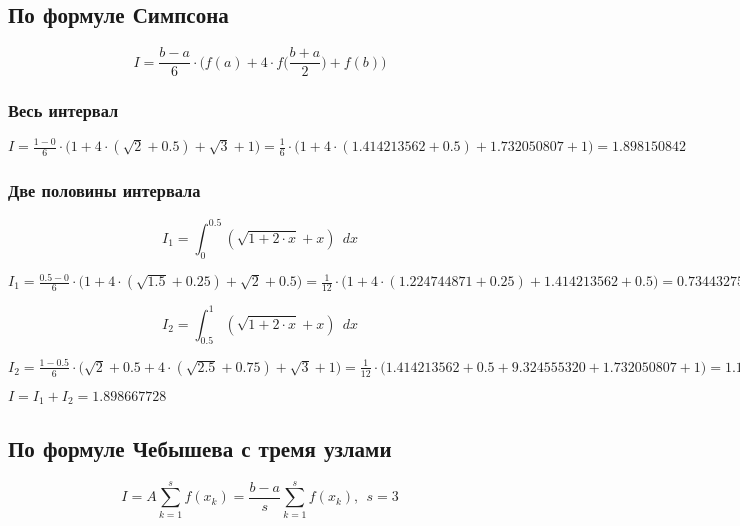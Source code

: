 \subsection{По формуле Симпсона}

\begin{displaymath}
I = \frac{b - a}{6} \cdot \Big ( f(a) + 4 \cdot f \Big (\frac{b+a}{2} \Big ) + f(b) \Big )
\end{displaymath}

\subsubsection{Весь интервал}

$I = \frac{1 - 0}{6} \cdot \Big ( 1 + 4 \cdot (\sqrt{2} + 0.5) + \sqrt{3} + 1 \Big ) = \frac{1}{6} \cdot \Big ( 1 + 4 \cdot (1.414213562 + 0.5) + 1.732050807 + 1 \Big ) = 1.898150842$

\subsubsection{Две половины интервала}

\begin{displaymath}
I_1 = \int_{0}^{0.5} (\sqrt{1 + 2 \cdot x} + x)\ \ dx
\end{displaymath}

$I_1 = \frac{0.5 - 0}{6} \cdot \Big ( 1 + 4 \cdot (\sqrt{1.5} + 0.25) + \sqrt{2} + 0.5 \Big ) = \frac{1}{12} \cdot \Big ( 1 + 4 \cdot (1.224744871 + 0.25) + 1.414213562 + 0.5 \Big ) = 0.734432754$

\begin{displaymath}
I_2 = \int_{0.5}^{1} (\sqrt{1 + 2 \cdot x} + x)\ \ dx
\end{displaymath}

$I_2 = \frac{1 - 0.5}{6} \cdot \Big ( \sqrt{2} + 0.5 +  4 \cdot (\sqrt{2.5} + 0.75) + \sqrt{3} + 1 \Big ) = \frac{1}{12} \cdot \Big ( 1.414213562 + 0.5 +  9.324555320 + 1.732050807 + 1 \Big ) = 1.164234974$

$I = I_1 + I_2 = 1.898667728$

\subsection{По формуле Чебышева с тремя узлами}

\begin{displaymath}
I = A \sum_{k=1}^{s} f(x_k) = \frac{b - a}{s} \sum_{k=1}^{s} f(x_k),\ \ s = 3
\end{displaymath}

